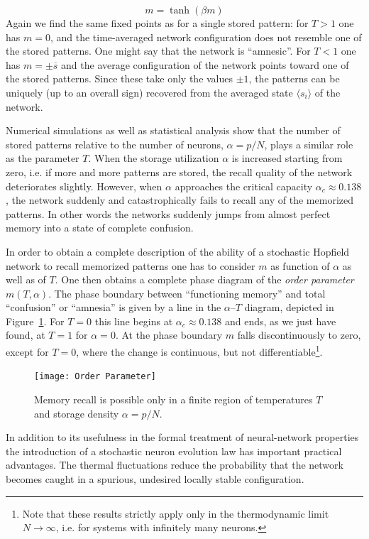 \begin{equation}
m=\tanh{(\beta m)}
\end{equation}
Again we find the same fixed points as for a single stored pattern: for $T>1$ one has $m=0$, and the time-averaged network configuration does not resemble one of the stored patterns. One might say that the network is ``amnesic''. For $T<1$ one has $m=\pm\overline{s}$ and the average configuration of the network points toward one of the stored patterns. Since these take only the values $\pm1$, the patterns can be uniquely (up to an overall sign) recovered from the averaged state $\langle s_i\rangle$ of the network.

Numerical simulations as well as statistical analysis show that the number of stored patterns relative to the number of neurons, $\alpha=p/N$, plays a similar role as the parameter $T$. When the storage utilization $\alpha$ is increased starting from zero, i.e. if more and more patterns are stored, the recall quality of the network deteriorates slightly. However, when $\alpha$ approaches the critical capacity $\alpha_c\approx0.138$, the network suddenly and catastrophically fails to recall any of the memorized patterns. In other words the networks suddenly jumps from almost perfect memory into a state of complete confusion.

In order to obtain a complete description of the ability of a stochastic Hopfield network to recall memorized patterns one has to consider $m$ as function of $\alpha$ as well as of $T$. One then obtains a complete phase diagram of
the \emph{order parameter} $m(T,\alpha)$. The phase boundary between ``functioning memory'' and total ``confusion'' or ``amnesia'' is given by a line in the $\alpha$--$T$ diagram, depicted in Figure~\ref{OrderParameter}. For $T=0$ this line begins at $\alpha_c\approx0.138$ and ends, as we just have found, at $T=1$ for $\alpha=0$. At the phase boundary $m$ falls discontinuously to zero, except for $T= 0$, where the change is continuous, but not differentiable\footnote{Note that these results strictly apply only in the thermodynamic limit $N\rightarrow\infty$, i.e. for systems with infinitely many neurons.}.
\begin{figure}[h!t]
\centering
\texttt{[image: Order Parameter]}
\caption{Memory recall is possible only in a finite region of temperatures $T$ and storage density $\alpha=p/N$.}\label{OrderParameter}
\end{figure}

In addition to its usefulness in the formal treatment of neural-network properties the introduction of a stochastic neuron evolution law has important practical advantages. The thermal fluctuations reduce the probability that the network becomes caught in a spurious, undesired locally stable configuration.
